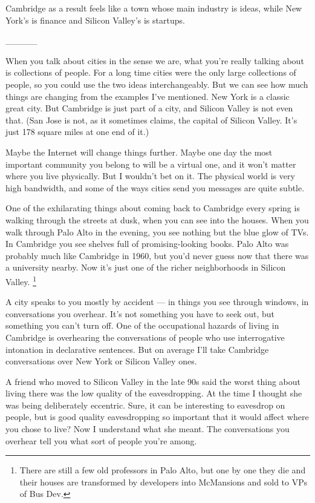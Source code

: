\documentclass[12pt]{book}
\begin{document}
Cambridge as a result feels like a town whose main industry is ideas,
while New York's is finance and Silicon Valley's is startups.

\_\_\_\_\_

When you talk about cities in the sense we are, what you're really
talking about is collections of people. For a long time cities were the
only large collections of people, so you could use the two ideas
interchangeably. But we can see how much things are changing from the
examples I've mentioned. New York is a classic great city. But Cambridge
is just part of a city, and Silicon Valley is not even that. (San Jose
is not, as it sometimes claims, the capital of Silicon Valley. It's just
178 square miles at one end of it.)

Maybe the Internet will change things further. Maybe one day the most
important community you belong to will be a virtual one, and it won't
matter where you live physically. But I wouldn't bet on it. The physical
world is very high bandwidth, and some of the ways cities send you
messages are quite subtle.

One of the exhilarating things about coming back to Cambridge every
spring is walking through the streets at dusk, when you can see into the
houses. When you walk through Palo Alto in the evening, you see nothing
but the blue glow of TVs. In Cambridge you see shelves full of
promising-looking books. Palo Alto was probably much like Cambridge in
1960, but you'd never guess now that there was a university nearby. Now
it's just one of the richer neighborhoods in Silicon Valley.
\footnote{There are still a few old professors in Palo Alto, but one by
one they die and their houses are transformed by developers into
McMansions and sold to VPs of Bus Dev.}

A city speaks to you mostly by accident --- in things you see through
windows, in conversations you overhear. It's not something you have to
seek out, but something you can't turn off. One of the occupational
hazards of living in Cambridge is overhearing the conversations of
people who use interrogative intonation in declarative sentences. But on
average I'll take Cambridge conversations over New York or Silicon
Valley ones.

A friend who moved to Silicon Valley in the late 90s said the worst
thing about living there was the low quality of the eavesdropping. At
the time I thought she was being deliberately eccentric. Sure, it can be
interesting to eavesdrop on people, but is good quality eavesdropping so
important that it would affect where you chose to live? Now I understand
what she meant. The conversations you overhear tell you what sort of
people you're among.
\end{document}
